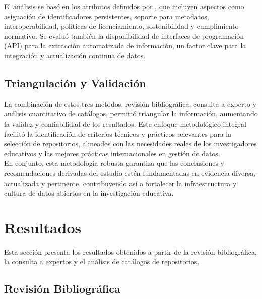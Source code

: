 \documentclass{article}
\begin{document}
El análisis se basó en los atributos definidos por \cite{witt_2024_11221855}, que incluyen aspectos como asignación de identificadores persistentes, soporte para metadatos, interoperabilidad, políticas de licenciamiento, sostenibilidad y cumplimiento normativo. Se evaluó también la disponibilidad de interfaces de programación (API) para la extracción automatizada de información, un factor clave para la integración y actualización continua de datos.\\

\subsection{Triangulación y Validación}
La combinación de estos tres métodos, revisión bibliográfica, consulta a experto y análisis cuantitativo de catálogos, permitió triangular la información, aumentando la validez y confiabilidad de los resultados. Este enfoque metodológico integral facilitó la identificación de criterios técnicos y prácticos relevantes para la selección de repositorios, alineados con las necesidades reales de los investigadores educativos y las mejores prácticas internacionales en gestión de datos.\\
En conjunto, esta metodología robusta garantiza que las conclusiones y recomendaciones derivadas del estudio estén fundamentadas en evidencia diversa, actualizada y pertinente, contribuyendo así a fortalecer la infraestructura y cultura de datos abiertos en la investigación educativa.\\

\section{Resultados}

Esta sección presenta los resultados obtenidos a partir de la revisión bibliográfica, la consulta a expertos y el análisis de catálogos de repositorios.

\subsection{Revisión Bibliográfica}
\end{document}
